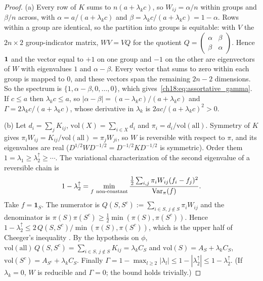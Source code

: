 \documentclass[../structural_economics_book.tex]{subfiles}
\begin{document}
\begin{proof}
(a) Every row of $K$ sums to $n(a + \lambda_k c)$, so $W_{ij} = \alpha/n$ within groups and $\beta/n$ across, with $\alpha = a/(a+\lambda_k c)$ and $\beta = \lambda_k c/(a+\lambda_k c) = 1 - \alpha$. Rows within a group are identical, so the partition into groups is equitable: with $V$ the $2n \times 2$ group-indicator matrix, $WV = VQ$ for the quotient $Q = \begin{pmatrix} \alpha & \beta \\ \beta & \alpha \end{pmatrix}$. Hence $\mathbf{1}$ and the vector equal to $+1$ on one group and $-1$ on the other are eigenvectors of $W$ with eigenvalues $1$ and $\alpha - \beta$. Every vector that sums to zero within each group is mapped to $0$, and these vectors span the remaining $2n-2$ dimensions. So the spectrum is $\{1, \alpha-\beta, 0, \ldots, 0\}$, which gives~\eqref{ch18:eq:assortative_gamma}. If $c \le a$ then $\lambda_k c \le a$, so $|\alpha-\beta| = (a-\lambda_k c)/(a+\lambda_k c)$ and $\Gamma = 2\lambda_k c/(a+\lambda_k c)$, whose derivative in $\lambda_k$ is $2ac/(a+\lambda_k c)^2 > 0$.

(b) Let $d_i = \sum_j K_{ij}$, $\mathrm{vol}(X) = \sum_{i\in X} d_i$ and $\pi_i = d_i/\mathrm{vol}(\text{all})$. Symmetry of $K$ gives $\pi_i W_{ij} = K_{ij}/\mathrm{vol}(\text{all}) = \pi_j W_{ji}$, so $W$ is reversible with respect to $\pi$, and its eigenvalues are real ($D^{1/2}WD^{-1/2} = D^{-1/2}KD^{-1/2}$ is symmetric). Order them $1 = \lambda_1 \ge \lambda_2^{\uparrow} \ge \cdots$. The variational characterization of the second eigenvalue of a reversible chain \citep[ch.~13]{levin2009markov} is
\[
1 - \lambda_2^{\uparrow} = \min_{f\ \text{non-constant}} \frac{\tfrac12\sum_{i,j}\pi_i W_{ij}(f_i - f_j)^2}{\operatorname{Var}_\pi(f)} .
\]
Take $f = \mathbf{1}_S$. The numerator is $Q(S,S^c) := \sum_{i\in S,\,j\notin S}\pi_i W_{ij}$ and the denominator is $\pi(S)\pi(S^c) \ge \tfrac12\min(\pi(S),\pi(S^c))$. Hence $1-\lambda_2^{\uparrow} \le 2\,Q(S,S^c)/\min(\pi(S),\pi(S^c))$, which is the upper half of Cheeger's inequality \citep[Thm.~13.14]{levin2009markov}. By the hypothesis on $\phi$, $\mathrm{vol}(\text{all})\,Q(S,S^c) = \sum_{i\in S,\,j\notin S}K_{ij} = \lambda_k C_S$ and $\mathrm{vol}(S) = A_S + \lambda_k C_S$, $\mathrm{vol}(S^c) = A_{S^c} + \lambda_k C_S$. Finally $\Gamma = 1 - \max_{l\ge2}|\lambda_l| \le 1 - |\lambda_2^{\uparrow}| \le 1 - \lambda_2^{\uparrow}$. (If $\lambda_k = 0$, $W$ is reducible and $\Gamma = 0$; the bound holds trivially.)
\end{proof}
\end{document}
